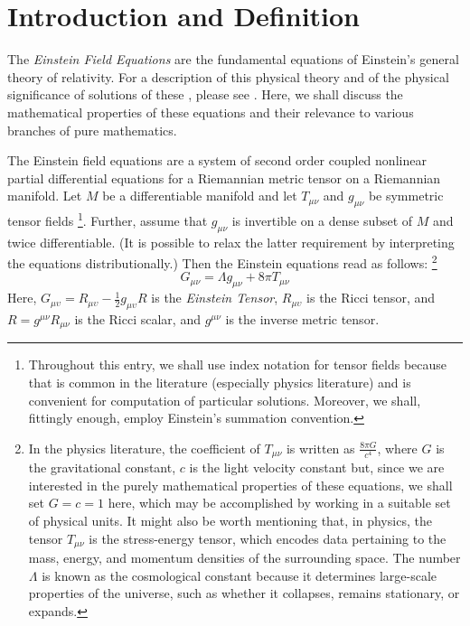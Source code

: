\documentclass[12pt]{article}
\begin{document}
\section{Introduction and Definition}

The \emph{Einstein Field Equations} are the fundamental equations of Einstein's
general theory of relativity.  For a description of this physical theory and of
the physical significance of solutions of these , please see 
.  Here, we shall discuss the mathematical properties of these
equations and their relevance to various branches of pure mathematics.

The Einstein field equations are a system of second order coupled nonlinear partial differential equations for a Riemannian metric tensor on a Riemannian manifold.  Let $M$ be
a differentiable manifold and let $T_{\mu \nu}$ and $g_{\mu \nu}$ be symmetric
tensor fields \footnote{Throughout this entry, we shall use index notation
for tensor fields because that is common in the literature (especially physics literature) and is convenient for computation of particular solutions.  
Moreover, we shall, fittingly enough, employ Einstein's summation convention.}.  Further, assume that $g_{\mu \nu}$ is invertible on a dense subset of $M$ and twice differentiable.  (It is possible to relax the latter requirement by interpreting the equations distributionally.)  Then the Einstein equations 
read as follows:
\footnote{In the physics literature, the coefficient of $T_{\mu \nu}$ is
written as $\frac{8\pi G}{c^4}$, where $G$ is the gravitational constant, 
$c$ is the light velocity constant but, since we are interested in the purely
mathematical properties of these equations, we shall set $G = c = 1$ here,
which may be accomplished by working in a suitable set of physical units.
It might also be worth mentioning that, in physics, the tensor $T_{\mu \nu}$ 
is the stress-energy tensor, which encodes data pertaining to the mass, energy, and momentum densities of the surrounding space.  The number $\Lambda$
is known as the cosmological constant because it determines large-scale
properties of the universe, such as whether it collapses, remains stationary, or expands.}
 \[G_{\mu \nu} = \Lambda g_{\mu \nu} + 8 \pi T_{\mu \nu}\]
Here, $G_{\mu\upsilon}=R_{\mu\upsilon}-\frac{1}{2}g_{\mu\upsilon}R$
is the \emph{Einstein Tensor}, $R_{\mu\upsilon}$ is the Ricci tensor, and 
$R=g^{\mu\nu}R_{\mu\nu}$ is the Ricci scalar, and $g^{\mu\nu}$ is the 
inverse metric tensor.  
\end{document}
